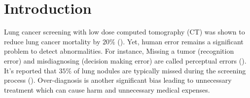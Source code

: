 \documentclass[preprint,12pt]{elsarticle}
\begin{document}

\section{Introduction}
Lung cancer screening with low dose computed tomography (CT) was shown to reduce lung cancer mortality by $20\%$ (\cite{CAAC:CAAC21387}). Yet, human error remains a significant problem to detect abnormalities. For instance, Missing a tumor (recognition error) and misdiagnosing (decision making error) are called perceptual errors (\cite{kundel1978visual}). It's reported that $35\%$ of lung nodules are typically missed during the screening process (\cite{caroline2014lung}). Over-diagnosis is another significant bias leading to unnecessary treatment which can cause harm and unnecessary medical expenses. 
% 
% 
% 
% 
% 
% 
% 
% 
% 
% 
% 
% 
% 
% 
% 
% 
\end{document}
